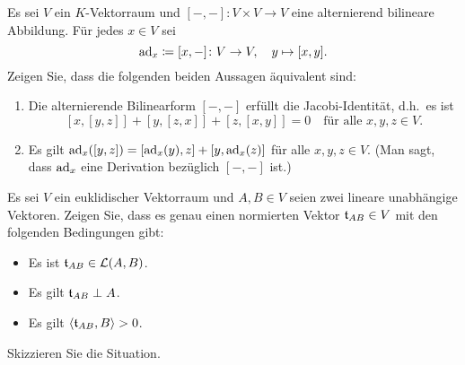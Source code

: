 \documentclass[a4paper, 10pt]{scrartcl}
\begin{document}
\begin{question}
  Es sei $V$ ein $K$-Vektorraum und $[-,-] \colon V \times V \to V$ eine alternierend bilineare Abbildung.
  Für jedes $x \in V$ sei
  \[
    \operatorname{ad}_x \coloneqq [x,-] \colon V \to V, \quad y \mapsto [x,y].
  \]
  Zeigen Sie, dass die folgenden beiden Aussagen äquivalent sind:
  \begin{enumerate}[leftmargin=*]
    \item
      Die alternierende Bilinearform $[-,-]$ erfüllt die Jacobi-Identität, d.h.\ es ist
      \[
        [x,[y,z]] + [y,[z,x]] + [z,[x,y]] = 0
        \quad
        \text{für alle $x, y, z \in V$}.
      \]
    \item
      Es gilt $\operatorname{ad}_x([y,z]) = [\operatorname{ad}_x(y), z] + [y, \operatorname{ad}_x(z)]$ für alle $x, y, z \in V$.
      (Man sagt, dass $\operatorname{ad}_x$ eine Derivation bezüglich $[-,-]$ ist.)
  \end{enumerate}
\end{question}


\begin{question}
  Es sei $V$ ein euklidischer Vektorraum und $A, B \in V$ seien zwei lineare unabhängige Vektoren.
  Zeigen Sie, dass es genau einen normierten Vektor $\mathfrak{t}_{AB} \in V$ mit den folgenden Bedingungen gibt:
  \begin{itemize}
    \item
      Es ist $\mathfrak{t}_{AB} \in \mathcal{L}(A, B)$.
    \item
      Es gilt $\mathfrak{t}_{AB} \perp A$.
    \item
      Es gilt $\left\langle \mathfrak{t}_{AB}, B \right\rangle > 0$.
  \end{itemize}
  Skizzieren Sie die Situation.
\end{question}










\newpage


\printsolutions
\end{document}
